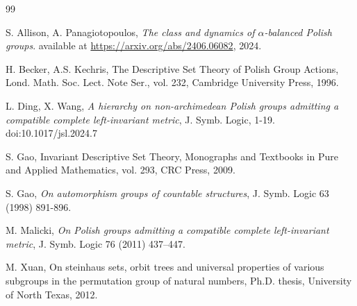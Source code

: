 \documentclass[11pt]{amsart}
\theoremstyle{definition}
\theoremstyle{remark}
\numberwithin{equation}{section}
\begin{document}
\begin{thebibliography}{99}

 S. Allison, A. Panagiotopoulos, \textit{The class and dynamics of $\alpha$-balanced Polish groups}. available at \url{https://arxiv.org/abs/2406.06082}, 2024.

 H. Becker, A.S. Kechris, The Descriptive Set Theory of Polish Group Actions, Lond. Math. Soc. Lect. Note Ser., vol. 232, Cambridge University Press, 1996.

 L. Ding, X. Wang, \textit{A hierarchy on non-archimedean Polish groups admitting a compatible complete left-invariant metric}, J. Symb. Logic, 1-19. doi:10.1017/jsl.2024.7

 S. Gao, Invariant Descriptive Set Theory, Monographs and Textbooks in Pure and Applied Mathematics, vol. 293, CRC Press, 2009.

 S. Gao, \textit{On automorphism groups of countable structures}, J. Symb. Logic 63 (1998) 891-896.






 M. Malicki, \textit{On Polish groups admitting a compatible complete left-invariant metric}, J. Symb. Logic 76 (2011) 437--447.

 M. Xuan, On steinhaus sets, orbit trees and universal properties of various subgroups in the permutation group of natural numbers, Ph.D. thesis, University of North Texas, 2012.

\end{thebibliography}
\end{document}

